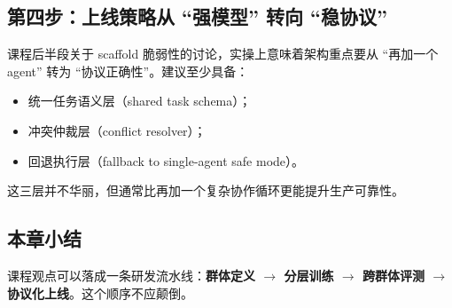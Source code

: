 \subsection{第四步：上线策略从 ``强模型'' 转向 ``稳协议''}
课程后半段关于 scaffold 脆弱性的讨论，实操上意味着架构重点要从 ``再加一个 agent'' 转为 ``协议正确性''。建议至少具备：
\begin{itemize}
    \item 统一任务语义层（shared task schema）；
    \item 冲突仲裁层（conflict resolver）；
    \item 回退执行层（fallback to single-agent safe mode）。
\end{itemize}

这三层并不华丽，但通常比再加一个复杂协作循环更能提升生产可靠性。

\subsection{本章小结}
课程观点可以落成一条研发流水线：\textbf{群体定义 $\rightarrow$ 分层训练 $\rightarrow$ 跨群体评测 $\rightarrow$ 协议化上线}。这个顺序不应颠倒。

